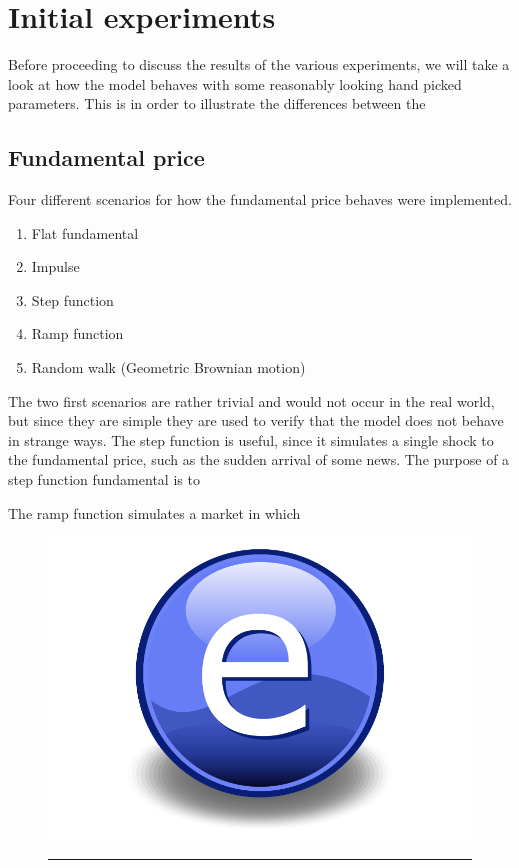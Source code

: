 \section{Initial experiments} %
\label{sec:initial_experiments}
Before proceeding to discuss the results of the various experiments, we will take a look at how the model behaves with some reasonably looking hand picked parameters. This is in order to illustrate the differences between the 
\subsection{Fundamental price}
Four different scenarios for how the fundamental price behaves were implemented. 
\begin{enumerate}
	\item Flat fundamental
	\item Impulse
	\item Step function
	\item Ramp function
	\item Random walk (Geometric Brownian motion)
\end{enumerate}
The two first scenarios are rather trivial and would not occur in the real world, but since they are simple they are used to verify that the model does not behave in strange ways. The step function is useful, since it simulates a single shock to the fundamental price, such as the sudden arrival of some news. The purpose of a step function fundamental is to 

The ramp function simulates a market in which 

\begin{figure}[htbp]
	\centering
		\includegraphics{Figures/Electron.pdf}
		\rule{35em}{0.5pt}
	\caption{}
	\label{fig:}
\end{figure}

